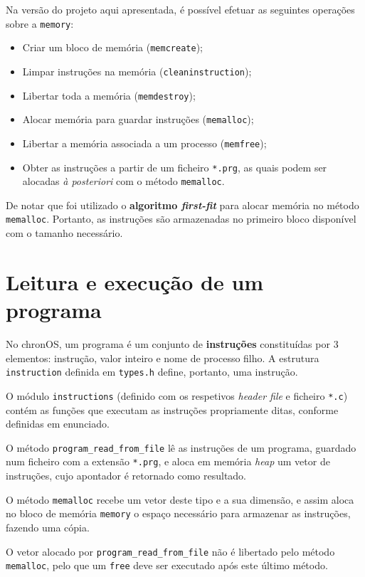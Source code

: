 \documentclass[a4paper,11pt,onecolumn,oneside]{article}
\newcommand{\chronOS}{\textsf{chronOS}}
\begin{document}
	Na versão do projeto aqui apresentada, é possível efetuar as seguintes operações sobre a \verb|memory|:
	\begin{itemize}
		\item Criar um bloco de memória (\verb|memcreate|);
		\item Limpar instruções na memória (\verb|cleaninstruction|);
		\item Libertar toda a memória (\verb|memdestroy|);
		\item Alocar memória para guardar instruções (\verb|memalloc|);
		\item Libertar a memória associada a um processo (\verb|memfree|);
		\item Obter as instruções a partir de um ficheiro \verb|*.prg|, as quais podem ser alocadas \textit{à posteriori} com o método \verb|memalloc|.
	\end{itemize}
	
	De notar que foi utilizado o \textbf{algoritmo \textit{first-fit}} para alocar memória no método \verb|memalloc|. Portanto, as instruções são armazenadas no primeiro bloco disponível com o tamanho necessário.
	
	
	\section{Leitura e execução de um programa}
	\label{sec:program}
	
	No \chronOS, um programa é um conjunto de \textbf{instruções} constituídas por 3 elementos: instrução, valor inteiro e nome de processo filho. A estrutura \verb|instruction| definida em \verb|types.h| define, portanto, uma instrução.
	
	O módulo \texttt{instructions} (definido com os respetivos \textit{header file} e ficheiro \verb|*.c|) contém as funções que executam as instruções propriamente ditas, conforme definidas em enunciado.
	
	O método \verb|program_read_from_file| lê as instruções de um programa, guardado num ficheiro com a extensão \verb|*.prg|, e aloca em memória \textit{heap} um vetor de instruções, cujo apontador é retornado como resultado.
	
	O método \verb|memalloc| recebe um vetor deste tipo e a sua dimensão, e assim aloca no bloco de memória \verb|memory| o espaço necessário para armazenar as instruções, fazendo uma cópia.
	
	O vetor alocado por \verb|program_read_from_file| não é libertado pelo método \verb|memalloc|, pelo que um \verb|free| deve ser executado após este último método.
	
\end{document}
